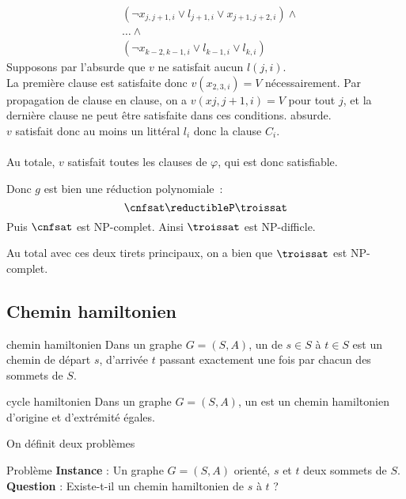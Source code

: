 \begin{demonstration}
\begin{itemize}
\begin{itemize}
\begin{align*}
                 & (\lnot x_{j, j+1,i} \vee l_{j+1,i} \vee x_{j+1,j+2,i}) \wedge\\
                 &\dots \wedge\\
                 & (\lnot x_{k-2, k-1,i} \vee l_{k-1,i} \vee l_{k,i})
            \end{align*}
            Supposons par l'absurde que $v$ ne satisfait aucun $l(j,i)$.\\
            La première clause est satisfaite donc $v(x_{2,3,i}) = V$ nécessairement. Par propagation de clause en clause, on a $v(x{j,j+1,i}) = V$ pour tout $j$, et la dernière clause ne peut être satisfaite dans ces conditions. absurde.\\
            $v$ satisfait donc au moins un littéral $l_i$ donc la clause $C_i$.\\\\
            Au totale, $v$ satisfait toutes les clauses de $\varphi$, qui est donc satisfiable.\\
        \end{itemize}
        Donc $g$ est bien une réduction polynomiale~:
        $$\cnfsat \reductibleP \troissat$$
        Puis $\cnfsat$ est NP-complet. Ainsi $\troissat$ est NP-difficle.
    \end{itemize}
    Au total avec ces deux tirets principaux, on a bien que $\troissat$ est NP-complet.
\end{demonstration}

\subsection{Chemin hamiltonien}

\begin{definition}{}{chemin hamiltonien}
    Dans un graphe $G = (S,A)$, un  de $s\in S$ à $t \in S$ est un chemin de départ $s$, d'arrivée $t$ passant exactement une fois par chacun des sommets de $S$.
\end{definition}

\begin{definition}{}{cycle hamiltonien}
    Dans un graphe $G = (S,A)$, un  est un chemin hamiltonien d'origine et d'extrémité égales.
\end{definition}

On définit deux problèmes

\begin{definition}{}{Problème \cheminham}
    \textbf{Instance} : Un graphe $G=(S,A)$ orienté, $s$ et $t$ deux sommets de $S$.
    \textbf{Question} : Existe-t-il un chemin hamiltonien de $s$ à $t$ ?
\end{definition}

